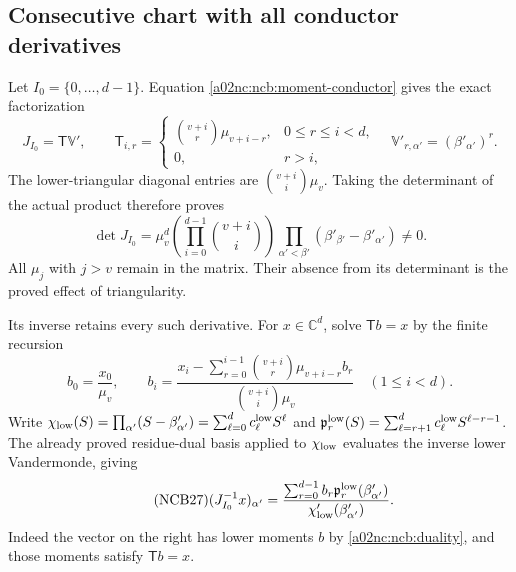 \subsection{Consecutive chart with all conductor derivatives}
Let $I_0=\{0,\ldots,d-1\}$. Equation \eqref{a02nc:ncb:moment-conductor}
gives the exact factorization
\begin{equation}\tag{NCB24}\label{a02nc:ncb:triangular}
J_{I_0}=\mathsf T\mathbb V',\qquad
\mathsf T_{i,r}=
\begin{cases}\binom{v+i}{r}\mu_{v+i-r},&0\leq r\leq i<d,\\
0,&r>i,\end{cases}
\quad \mathbb V'_{r,\alpha'}=(\beta'_{\alpha'})^r .
\end{equation}
The lower-triangular diagonal entries are
$\binom{v+i}{i}\mu_v$. Taking the determinant of the actual product
therefore proves
\begin{equation}\tag{NCB25}\label{a02nc:ncb:consecutive-det}
\det J_{I_0}
=\mu_v^d\left(\prod_{i=0}^{d-1}\binom{v+i}{i}\right)
 \prod_{\alpha'<\beta'}(\beta'_{\beta'}-\beta'_{\alpha'})\ne0 .
\end{equation}
All $\mu_j$ with $j>v$ remain in the matrix. Their absence from its
determinant is the proved effect of triangularity.

Its inverse retains every such derivative. For $x\in\mathbb C^d$,
solve $\mathsf T b=x$ by the finite recursion
\begin{equation}\tag{NCB26}\label{a02nc:ncb:triangular-inverse}
b_0=\frac{x_0}{\mu_v},\qquad
b_i=\frac{x_i-\sum_{r=0}^{i-1}
          \binom{v+i}{r}\mu_{v+i-r}b_r}
          {\binom{v+i}{i}\mu_v}\quad(1\leq i<d).
\end{equation}
Write
$\chi_{\rm low}(S)=\prod_{\alpha'}(S-\beta'_{\alpha'})
=\sum_{\ell=0}^{d}c_\ell^{\rm low}S^\ell$
and
$\mathfrak p_r^{\rm low}(S)
=\sum_{\ell=r+1}^{d}c_\ell^{\rm low}S^{\ell-r-1}$.
The already proved residue-dual basis applied to $\chi_{\rm low}$
evaluates the inverse lower Vandermonde, giving
\begin{equation}\tag{NCB27}\label{a02nc:ncb:full-inverse}
(J_{I_0}^{-1}x)_{\alpha'}
=\frac{\sum_{r=0}^{d-1}b_r\mathfrak p_r^{\rm low}(\beta'_{\alpha'})}
          {\chi_{\rm low}'(\beta'_{\alpha'})}.
\end{equation}
Indeed the vector on the right has lower moments $b$ by
\eqref{a02nc:ncb:duality}, and those moments satisfy $\mathsf T b=x$.

